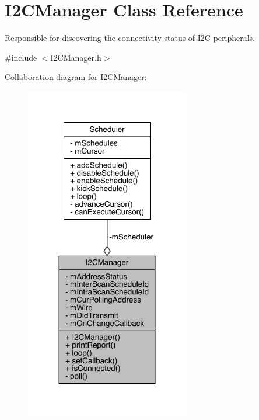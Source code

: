 \hypertarget{class_i2_c_manager}{}\section{I2\+C\+Manager Class Reference}
\label{class_i2_c_manager}


Responsible for discovering the connectivity status of I2C peripherals.  




{\ttfamily \#include $<$I2\+C\+Manager.\+h$>$}



Collaboration diagram for I2\+C\+Manager\+:\nopagebreak
\begin{figure}[H]
\begin{center}
\leavevmode
\includegraphics[width=203pt]{class_i2_c_manager__coll__graph}
\end{center}
\end{figure}
